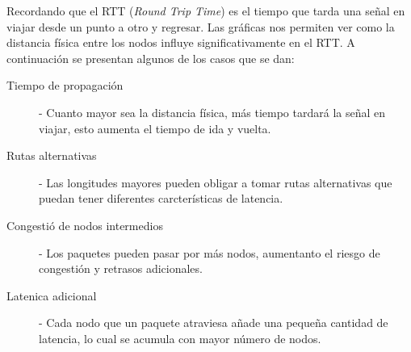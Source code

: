 \newpage
\noindent Recordando que el RTT (\emph{Round Trip Time}) es el tiempo que tarda una señal en viajar desde un punto a otro y regresar. Las gr\'aficas nos permiten ver como la distancia f\'isica entre los nodos influye significativamente en el RTT. A continuaci\'on se presentan algunos de los casos que se dan:

\begin{description}
    \item [Tiempo de propagaci\'on] - Cuanto mayor sea la distancia f\'isica, m\'as tiempo tardar\'a la señal en viajar, esto aumenta el tiempo de ida y vuelta.
    \item [Rutas alternativas] - Las longitudes mayores pueden obligar a tomar rutas alternativas que puedan tener diferentes carcter\'isticas de latencia.
    \item [Congesti\'o de nodos intermedios] - Los paquetes pueden pasar por m\'as nodos, aumentanto el riesgo de congesti\'on y retrasos adicionales.
    \item [Latenica adicional] - Cada nodo que un paquete atraviesa añade una pequeña cantidad de latencia, lo cual se acumula con mayor n\'umero de nodos.
\end{description}